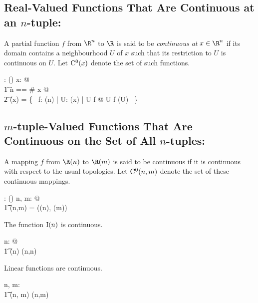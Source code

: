 \documentclass{amsart}
\begin{document}
\subsection{Real-Valued Functions That Are Continuous at an $n$-tuple: }

A partial function $f$ from $\R^n$ to $\R$ is said to be \textit{continuous at} $x \in \R^n$ if its domain contains a neighbourhood $U$ of $x$
such that its restriction to $U$ is continuous on $U$.
Let $\operatorname{C^0}(x)$ denote the set of such functions.

\begin{axdef}
	\CzeroPointRtup: \Rinf \fun \power(\Rinf \pfun \R)
\where
	\forall x: \Rinf @ \\
	\t1	\LET n == \# x @ \\
	\t2		\CzeroPointRtup(x) = \{~ f: \Rtup(n) \pfun \R | \exists U: \neighRinf(x) | U \subseteq \dom f @ U \dres f \in \CzeroSubsetRtup(U) ~\}
\end{axdef}

\subsection{$m$-tuple-Valued Functions That Are Continuous on the Set of All $n$-tuples: }

A mapping $f$ from $\Rtup(n)$ to $\Rtup(m)$ is said to be continuous if it is continuous with respect to the usual topologies.
Let $\operatorname{C^0}(n,m)$ denote the set of these continuous mappings.

\begin{axdef}
	\CzeroRtupRtup: \nat \cross \nat \fun \power(\Rinf \pfun \Rinf)
\where
	\forall n, m: \nat @ \\
	\t1	\CzeroRtupRtup(n,m) = \CzeroTT(\tsRtup(n), \tsRtup(m))
\end{axdef}

\begin{example}
The function $\operatorname{I}(n)$ is continuous.

\begin{zed}
	\forall n: \nat @ \\
	\t1	\idRtup(n) \in \CzeroRtupRtup(n,n)
\end{zed}

\begin{theorem}
Linear functions are continuous.

\begin{zed}
	\forall n, m: \nat@ \\
	\t1	\linRtup(n, m) \subseteq \CzeroRtupRtup(n,m)
\end{zed}

\end{theorem}

\end{example}
\end{document}
